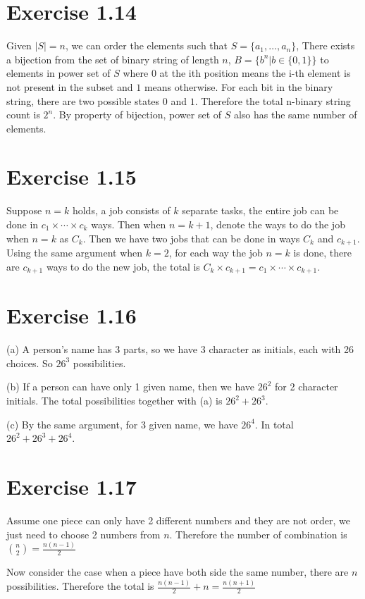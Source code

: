 \documentclass[12pt]{article}
\begin{document}
\section*{Exercise 1.14}
Given $|S| = n$, we can order the elements such that $S=\{a_1,\ldots, a_n\}$, There exists a bijection from the set of binary string of length $n$, $B = \{b^n|b\in \{0,1\}\}$ to elements in power set of $S$ where $0$ at the ith position means the i-th element is not present in the subset and $1$ means otherwise.  For each bit in the binary string, there are two possible states $0$ and $1$. Therefore the total n-binary string count is $2^n$. By property of bijection, power set of $S$ also has the same number of elements.

\section*{Exercise 1.15}
Suppose $n=k$ holds, a job consists of $k$ separate tasks, the entire job can be done in $c_1 \times \cdots \times c_k$ ways. Then when $n=k+1$, denote the ways to do the job when $n=k$ as $C_k$. Then we have two jobs that can be done in ways $C_k$ and $c_{k+1}$. Using the same argument when $k=2$, for each way the job $n=k$ is done, there are $c_{k+1}$ ways to do the new job, the total is $C_k \times c_{k+1} = c_1 \times \cdots \times c_{k+1}$. \QED

\section*{Exercise 1.16}
(a) A person's name has 3 parts, so we have 3 character as initials, each with 26 choices. So $26^3$ possibilities.

(b) If a person can have only 1 given name, then we have $26^2$ for 2 character initials. The total possibilities together with (a) is $26^2 + 26^3$.

(c) By the same argument, for 3 given name, we have $26^4$. In total $26^2+26^3+26^4$.

\section*{Exercise 1.17}
Assume one piece can only have 2 different numbers and they are not order, we just need to choose 2 numbers from $n$. Therefore the number of combination is ${n \choose 2} = \frac{n(n-1)}{2}$

Now consider the case when a piece have both side the same number, there are $n$ possibilities.
Therefore the total is $\frac{n(n-1)}{2} + n  = \frac{n(n+1)}{2}$
\end{document}
